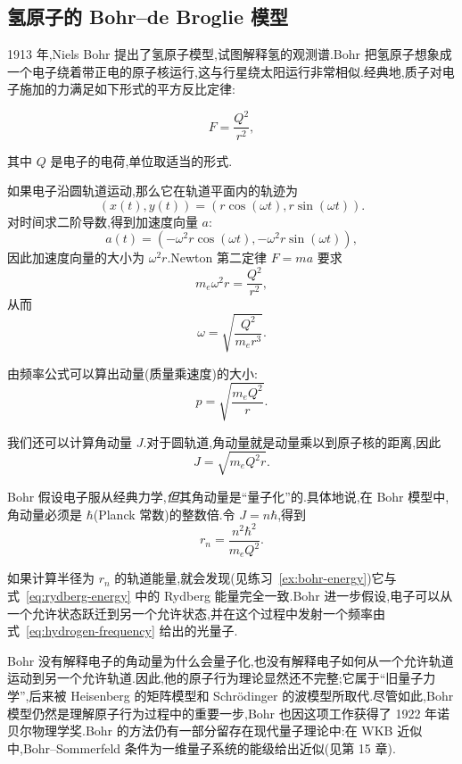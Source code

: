 \subsection{氢原子的 Bohr--de Broglie 模型}\label{subsec:bohr-debroglie}

1913 年,Niels Bohr 提出了氢原子模型,试图解释氢的观测谱.Bohr 把氢原子想象成一个电子绕着带正电的原子核运行,这与行星绕太阳运行非常相似.经典地,质子对电子施加的力满足如下形式的平方反比定律:

\begin{equation}
  F=\frac{Q^2}{r^2},\label{eq:coulomb-force}
\end{equation}

其中 $Q$ 是电子的电荷,单位取适当的形式.

如果电子沿圆轨道运动,那么它在轨道平面内的轨迹为
\[
  (x(t),y(t))=(r\cos(\omega t),r\sin(\omega t)).
\]
对时间求二阶导数,得到加速度向量 $a$:
\[
  a(t)=(-\omega^2r\cos(\omega t),-\omega^2r\sin(\omega t)),
\]
因此加速度向量的大小为 $\omega^2r$.Newton 第二定律 $F=ma$ 要求
\[
  m_e\omega^2r=\frac{Q^2}{r^2},
\]
从而
\begin{equation}
  \omega=\sqrt{\frac{Q^2}{m_e r^3}}.\label{eq:bohr-orbit-frequency}
\end{equation}

由频率公式可以算出动量(质量乘速度)的大小:
\begin{equation}
  p=\sqrt{\frac{m_eQ^2}{r}}.\label{eq:bohr-momentum}
\end{equation}

我们还可以计算角动量 $J$.对于圆轨道,角动量就是动量乘以到原子核的距离,因此
\begin{equation}
  J=\sqrt{m_eQ^2r}.\label{eq:bohr-angular-momentum}
\end{equation}

Bohr 假设电子服从经典力学,\textit{但}其角动量是“量子化”的.具体地说,在 Bohr 模型中,角动量必须是 $\hbar$(Planck 常数)的整数倍.令 $J=n\hbar$,得到
\begin{equation}
  r_n=\frac{n^2\hbar^2}{m_eQ^2}.\label{eq:bohr-radii}
\end{equation}

如果计算半径为 $r_n$ 的轨道能量,就会发现(见练习~\ref{ex:bohr-energy})它与式~\eqref{eq:rydberg-energy} 中的 Rydberg 能量完全一致.Bohr 进一步假设,电子可以从一个允许状态跃迁到另一个允许状态,并在这个过程中发射一个频率由式~\eqref{eq:hydrogen-frequency} 给出的光量子.

Bohr 没有解释电子的角动量为什么会量子化,也没有解释电子如何从一个允许轨道运动到另一个允许轨道.因此,他的原子行为理论显然还不完整;它属于“旧量子力学”,后来被 Heisenberg 的矩阵模型和 Schrödinger 的波模型所取代.尽管如此,Bohr 模型仍然是理解原子行为过程中的重要一步,Bohr 也因这项工作获得了 1922 年诺贝尔物理学奖.Bohr 的方法仍有一部分留存在现代量子理论中:在 WKB 近似中,Bohr--Sommerfeld 条件为一维量子系统的能级给出近似(见第 15 章).


